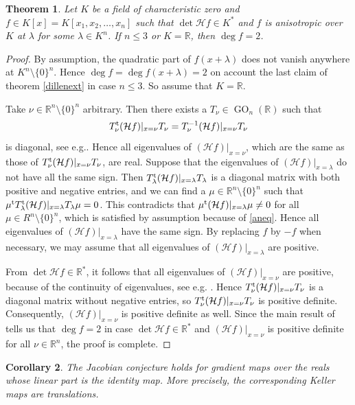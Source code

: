\documentclass[10pt]{article}
\newtheorem{theorem}{Theorem}[section]
\newtheorem{corollary}[theorem]{Corollary}
\theoremstyle{remark}
\theoremstyle{definition}
\newcommand{\hess}{{\mathcal H}}
\newcommand{\GO}{\operatorname{GO}}
\newcommand{\R}{{\mathbb R}}
\newcommand{\tp}{^{\rm t}}
\begin{document}
\begin{theorem} \label{definite}
Let $K$ be a field of characteristic zero and $f \in K[x] = K[x_1,x_2,\allowbreak \ldots,x_n]$
such that $\det \hess f \in K^{*}$ and $f$ is anisotropic over $K$ at $\lambda$ for
some $\lambda \in K^n$. If $n \le 3$ or $K = \R$, then $\deg f = 2$.
\end{theorem}

\begin{proof}
By assumption, the quadratic part of $f(x+\lambda)$ does not vanish anywhere at $K^n 
\setminus \{0\}^n$. Hence $\deg f = \deg f(x + \lambda) = 2$ on account the last claim 
of theorem \ref{dillenext} in case $n \le 3$. So assume that $K = \R$. 

Take $\nu \in \R^n \setminus \{0\}^n$ arbitrary. Then there exists a $T_{\nu} \in \GO_n(\R)$ such 
that 
$$
T_{\nu}\tp (\hess f)|_{x=\nu} T_{\nu} = T_{\nu}^{-1} (\hess f)|_{x=\nu} T_{\nu}
$$
is diagonal, see e.g.\@ \cite[Cor.\@ 3.3.1]{MR1923507}. 
Hence all eigenvalues of $(\hess f)|_{x=\nu}$, which are the same as those of
$T_{\nu}\tp (\hess f)|_{x=\nu} T_{\nu}$, are real. Suppose that the eigenvalues of 
$(\hess f)|_{x=\lambda}$ do not have all the same sign. Then 
$T_{\lambda}\tp (\hess f)|_{x=\lambda} T_{\lambda}$ is a diagonal matrix with both positive and negative 
entries, and we can find a $\mu \in \R^n \setminus \{0\}^n$ 
such that $\mu\tp T_{\lambda}\tp (\hess f)|_{x=\lambda} T_{\lambda} \mu = 0$.
This contradicts that $\mu\tp (\hess f)|_{x=\lambda} \mu \ne 0$ for all $\mu \in R^n \setminus \{0\}^n$,
which is satisfied by assumption because of \eqref{aneq}. Hence all eigenvalues of $(\hess f)|_{x=\lambda}$
have the same sign. By replacing $f$ by $-f$ when necessary, we may assume that all eigenvalues of 
$(\hess f)|_{x=\lambda}$ are positive.

From $\det \hess f \in \R^{*}$, it follows that all eigenvalues of $(\hess f)|_{x=\nu}$ are 
positive, because of the continuity of eigenvalues, see e.g. \cite[Th.\@ 3.1.2]{MR1923507}. 
Hence $T_{\nu}\tp (\hess f)|_{x=\nu} T_{\nu}$ is a diagonal matrix without negative 
entries, so $T_{\nu}\tp (\hess f)|_{x=\nu} T_{\nu}$ is positive definite.
Consequently, $(\hess f)|_{x=\nu}$ is positive definite as well. Since the 
main result of \cite{MR0319126} tells us that $\deg f = 2$ in case $\det \hess f \in \R^{*}$
and $(\hess f)|_{x=\nu}$ is positive definite for all $\nu \in \R^n$, the
proof is complete.
\end{proof}

\begin{corollary}
The Jacobian conjecture holds for
gradient maps over the reals whose linear part is the identity map. More precisely, the
corresponding Keller maps are translations.
\end{corollary}
\end{document}
